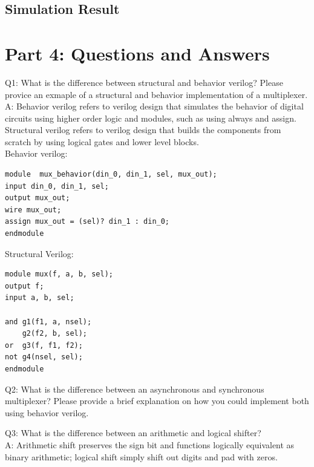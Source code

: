 \documentclass{article}
\begin{document}
\subsection{Simulation Result}



\section{Part 4: Questions and Answers}
Q1: What is the difference between structural and behavior verilog? Please provice an exmaple of a structural and behavior implementation of a multiplexer. \\
A: Behavior verilog refers to verilog design that simulates the behavior of digital circuits using higher order logic and modules, such as using always and assign. Structural verilog refers to verilog design that builds the components from scratch by using logical gates and lower level blocks.  \\
Behavior verilog: 
\begin{verbatim}
module  mux_behavior(din_0, din_1, sel, mux_out); 
input din_0, din_1, sel;
output mux_out;
wire mux_out;
assign mux_out = (sel)? din_1 : din_0;
endmodule
\end{verbatim}
Structural Verilog:
\begin{verbatim}
module mux(f, a, b, sel);
output f;
input a, b, sel;

and g1(f1, a, nsel);
	g2(f2, b, sel); 
or  g3(f, f1, f2);
not g4(nsel, sel); 
endmodule 
\end{verbatim}

Q2: What is the difference between an asynchronous and synchronous multiplexer? Please provide a brief explanation on how you could implement both using behavior verilog. \\
\vspace{5mm}

Q3: What is the difference between an arithmetic and logical shifter?\\
A: Arithmetic shift preserves the sign bit and functions logically equivalent as binary arithmetic; logical shift simply shift out digits and pad with zeros.\\
\end{document}
